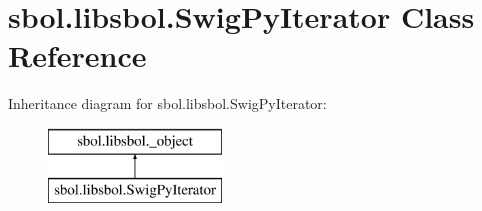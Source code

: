 \hypertarget{classsbol_1_1libsbol_1_1_swig_py_iterator}{}\section{sbol.\+libsbol.\+Swig\+Py\+Iterator Class Reference}
\label{classsbol_1_1libsbol_1_1_swig_py_iterator}
Inheritance diagram for sbol.\+libsbol.\+Swig\+Py\+Iterator\+:\begin{figure}[H]
\begin{center}
\leavevmode
\includegraphics[height=2.000000cm]{classsbol_1_1libsbol_1_1_swig_py_iterator}
\end{center}
\end{figure}
